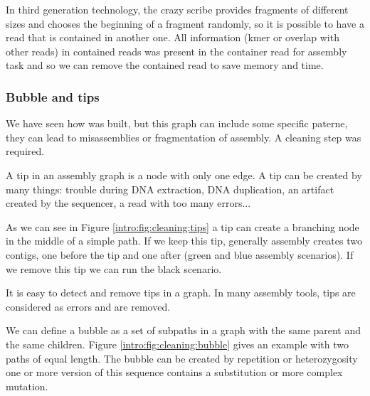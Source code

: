 \documentclass[main]{subfiles}
\begin{document}
In third generation technology, the crazy scribe provides fragments of different sizes and chooses the beginning of a fragment randomly, so it is possible to have a read that is contained in another one. All information (kmer or overlap with other reads) in contained reads was present in the container read for assembly task and so we can remove the contained read to save memory and time.

\subsubsection{Bubble and tips} \label{intro:subsubsec:bubble_tips}

We have seen how \OLC was built, but this graph can include some specific paterne, they can lead to misassemblies or fragmentation of assembly. A cleaning step was required.

\begin{figure}[ht]
    \caption{}
    \label{intro:fig:cleaning}
\end{figure}

A tip in an assembly graph is a node with only one edge. A tip can be created by many things: trouble during DNA extraction, DNA duplication, an artifact created by the sequencer, a read with too many errors...

As we can see in Figure \ref{intro:fig:cleaning:tips} a tip can create a branching node in the middle of a simple path. If we keep this tip, generally assembly creates two contigs, one before the tip and one after (green and blue assembly scenarios). If we remove this tip we can run the black scenario.

It is easy to detect and remove tips in a graph. In many assembly tools, tips are considered as errors and are removed.

We can define a bubble as a set of subpaths in a graph with the same parent and the same children. Figure \ref{intro:fig:cleaning:bubble} gives an example with two paths of equal length. The bubble can be created by repetition or heterozygosity one or more version of this sequence contains a substitution or more complex mutation.
\end{document}
